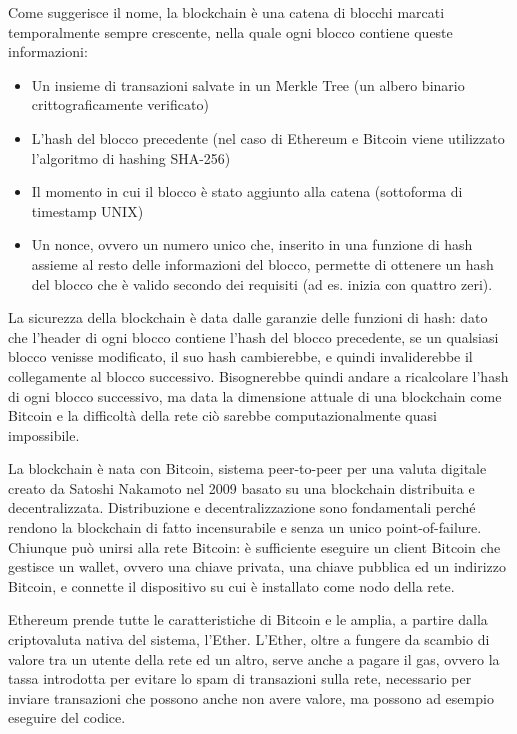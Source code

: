 Come suggerisce il nome, la blockchain è una catena di blocchi marcati temporalmente sempre crescente,
nella quale ogni blocco contiene queste informazioni:

\begin{itemize}
    \item Un insieme di transazioni salvate in un Merkle Tree (un albero binario crittograficamente verificato)
    \item L'hash del blocco precedente (nel caso di Ethereum e Bitcoin viene utilizzato l'algoritmo di hashing SHA-256)
    \item Il momento in cui il blocco è stato aggiunto alla catena (sottoforma di timestamp UNIX)
    \item Un nonce, ovvero un numero unico che, inserito in una funzione di hash assieme al resto delle informazioni del blocco,
    permette di ottenere un hash del blocco che è valido secondo dei requisiti (ad es. inizia con quattro zeri).
\end{itemize}

La sicurezza della blockchain è data dalle garanzie delle funzioni di hash: dato che l'header di ogni blocco contiene
l'hash del blocco precedente, se un qualsiasi blocco venisse modificato, il suo hash cambierebbe, e quindi invaliderebbe 
il collegamente al blocco successivo. Bisognerebbe quindi andare a ricalcolare l'hash di ogni blocco successivo,
ma data la dimensione attuale di una blockchain come Bitcoin e la difficoltà della rete
ciò sarebbe computazionalmente quasi impossibile.

La blockchain è nata con Bitcoin, sistema peer-to-peer per una valuta digitale creato da Satoshi Nakamoto nel 2009
basato su una blockchain distribuita e decentralizzata. 
Distribuzione e decentralizzazione sono fondamentali perché rendono la blockchain di fatto incensurabile
e senza un unico point-of-failure. Chiunque può unirsi alla rete Bitcoin: è sufficiente eseguire un client Bitcoin che gestisce un wallet, ovvero
una chiave privata, una chiave pubblica ed un indirizzo Bitcoin, e connette il dispositivo su cui è installato come nodo della rete.

Ethereum prende tutte le caratteristiche di Bitcoin e le amplia, a partire dalla criptovaluta nativa del sistema, l'Ether.
L'Ether, oltre a fungere da scambio di valore tra un utente della rete ed un altro, serve anche a pagare il gas, ovvero la tassa
introdotta per evitare lo spam di transazioni sulla rete, necessario per inviare transazioni che possono anche non avere valore,
ma possono ad esempio eseguire del codice.

